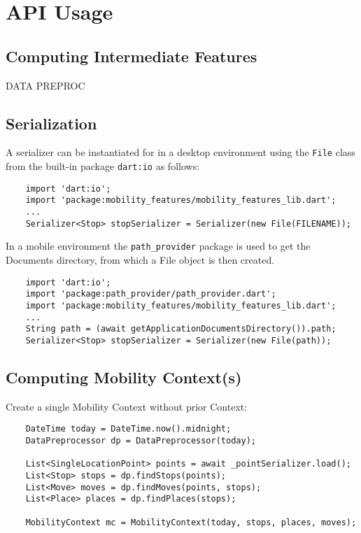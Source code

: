 \section{API Usage}
\subsection{Computing Intermediate Features}
DATA PREPROC

\subsection{Serialization}
A serializer can be instantiated for in a desktop environment using the \verb|File| class from the built-in package \verb|dart:io| as follows:
\begin{verbatim}
    import 'dart:io';
    import 'package:mobility_features/mobility_features_lib.dart';
    ...
    Serializer<Stop> stopSerializer = Serializer(new File(FILENAME));
\end{verbatim}

In a mobile environment the \verb|path_provider| package is used to get the Documents directory, from which a File object is then created.

\begin{verbatim}
    import 'dart:io';
    import 'package:path_provider/path_provider.dart';
    import 'package:mobility_features/mobility_features_lib.dart';
    ...
    String path = (await getApplicationDocumentsDirectory()).path;
    Serializer<Stop> stopSerializer = Serializer(new File(path));
\end{verbatim}

\subsection{Computing Mobility Context(s)}
Create a single Mobility Context without prior Context:

\begin{verbatim}
    DateTime today = DateTime.now().midnight;
    DataPreprocessor dp = DataPreprocessor(today);

    List<SingleLocationPoint> points = await _pointSerializer.load();
    List<Stop> stops = dp.findStops(points);
    List<Move> moves = dp.findMoves(points, stops);
    List<Place> places = dp.findPlaces(stops);
    
    MobilityContext mc = MobilityContext(today, stops, places, moves);
\end{verbatim}


